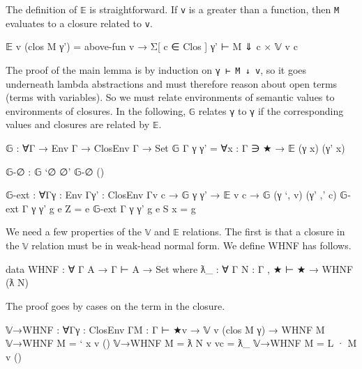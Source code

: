 The definition of \texttt{𝔼} is straightforward. If \texttt{v} is a
greater than a function, then \texttt{M} evaluates to a closure related
to \texttt{v}.

\begin{fence}
\begin{code}
𝔼 v (clos M γ') = above-fun v → Σ[ c ∈ Clos ] γ' ⊢ M ⇓ c × 𝕍 v c
\end{code}
\end{fence}

The proof of the main lemma is by induction on \texttt{γ\ ⊢\ M\ ↓\ v},
so it goes underneath lambda abstractions and must therefore reason
about open terms (terms with variables). So we must relate environments
of semantic values to environments of closures. In the following,
\texttt{𝔾} relates \texttt{γ} to \texttt{γ\textquotesingle{}} if the
corresponding values and closures are related by \texttt{𝔼}.

\begin{fence}
\begin{code}
𝔾 : ∀{Γ} → Env Γ → ClosEnv Γ → Set
𝔾 {Γ} γ γ' = ∀{x : Γ ∋ ★} → 𝔼 (γ x) (γ' x)

𝔾-∅ : 𝔾 `∅ ∅'
𝔾-∅ {()}

𝔾-ext : ∀{Γ}{γ : Env Γ}{γ' : ClosEnv Γ}{v c}
      → 𝔾 γ γ' → 𝔼 v c → 𝔾 (γ `, v) (γ' ,' c)
𝔾-ext {Γ} {γ} {γ'} g e {Z} = e
𝔾-ext {Γ} {γ} {γ'} g e {S x} = g
\end{code}
\end{fence}

We need a few properties of the \texttt{𝕍} and \texttt{𝔼} relations. The
first is that a closure in the \texttt{𝕍} relation must be in weak-head
normal form. We define WHNF has follows.

\begin{fence}
\begin{code}
data WHNF : ∀ {Γ A} → Γ ⊢ A → Set where
  ƛ_ : ∀ {Γ} {N : Γ , ★ ⊢ ★}
     → WHNF (ƛ N)
\end{code}
\end{fence}

The proof goes by cases on the term in the closure.

\begin{fence}
\begin{code}
𝕍→WHNF : ∀{Γ}{γ : ClosEnv Γ}{M : Γ ⊢ ★}{v}
       → 𝕍 v (clos M γ) → WHNF M
𝕍→WHNF {M = ` x} {v} ()
𝕍→WHNF {M = ƛ N} {v} vc = ƛ_
𝕍→WHNF {M = L · M} {v} ()
\end{code}
\end{fence}

